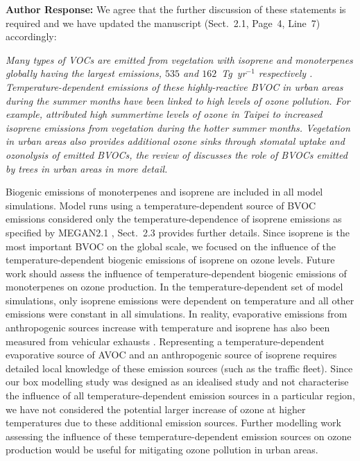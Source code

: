 \documentclass{article}
\begin{document}
\textbf{Author Response:} We agree that the further discussion of these statements is required and we have updated the manuscript (Sect.~2.1, Page~4, Line~7) accordingly:
{\itshape
Many types of VOCs are emitted from vegetation with isoprene and monoterpenes globally having the largest emissions, $535$ and $162$~Tg~yr$^{-1}$ respectively \citep{Guenther:2012}.
Temperature-dependent emissions of these highly-reactive BVOC in urban areas during the summer months have been linked to high levels of ozone pollution.
For example, \citet{Wang:2013} attributed high summertime levels of ozone in Taipei to increased isoprene emissions from vegetation during the hotter summer months.
Vegetation in urban areas also provides additional ozone sinks through stomatal uptake and ozonolysis of emitted BVOCs, the review of \citet{Calfapietra:2013} discusses the role of BVOCs emitted by trees in urban areas in more detail.

Biogenic emissions of monoterpenes and isoprene are included in all model simulations. 
Model runs using a temperature-dependent source of BVOC emissions considered only the temperature-dependence of isoprene emissions as specified by MEGAN2.1 \citep{Guenther:2012}, Sect.~2.3 provides further details. 
Since isoprene is the most important BVOC on the global scale, we focused on the influence of the temperature-dependent biogenic emissions of isoprene on ozone levels.
Future work should assess the influence of temperature-dependent biogenic emissions of monoterpenes on ozone production.
In the temperature-dependent set of model simulations, only isoprene emissions were dependent on temperature and all other emissions were constant in all simulations.
In reality, evaporative emissions from anthropogenic sources increase with temperature \citep{Rubin:2006} and isoprene has also been measured from vehicular exhausts \citep{Borbon:2001}.
Representing a temperature-dependent evaporative source of AVOC and an anthropogenic source of isoprene requires detailed local knowledge of these emission sources (such as the traffic fleet).
Since our box modelling study was designed as an idealised study and not characterise the influence of all temperature-dependent emission sources in a particular region, we have not considered the potential larger increase of ozone at higher temperatures due to these additional emission sources.
Further modelling work assessing the influence of these temperature-dependent emission sources on ozone production would be useful for mitigating ozone pollution in urban areas.
}
\end{document}
